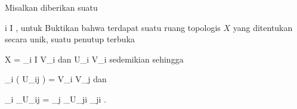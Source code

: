 {

Misalkan diberikan suatu

 {}
 {i \in I} {}
 {} {} {} {,}
untuk
Buktikan bahwa terdapat suatu ruang topologis $X$ yang ditentukan secara unik, suatu penutup terbuka

\mavergleichskette
{\vergleichskette
{ X
}
{ = }{ \bigcup_{i \in I} V_i
}
{  }{
}
{    }{
}
{   }{
}
}
{}{}{}
dan
 {U_i } { V_i
} {}
sedemikian sehingga

\mavergleichskettedisp
{\vergleichskette
{ \psi_i  \left(  U_{ij}  \right)
}
{ =} { V_i \cap V_j
}
{ } {
}
{ } {
}
{ } {
}
}
{}{}{}
dan

\mavergleichskettedisp
{\vergleichskette
{ \psi_i \vert_{U_{ij} }
}
{ =} { \psi_j \vert_{U_{ji} }  \circ   \varphi_{ji}
}
{ } {
}
{ } {
}
{ } {
}
}
{}{}{}.

}
